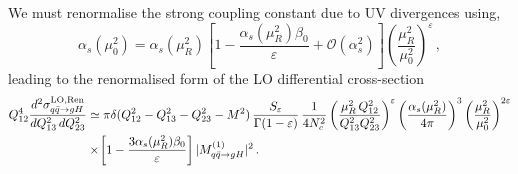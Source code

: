 We must renormalise the strong coupling constant due to UV divergences using,
\begin{equation}
  \label{eq:Catani-renorm}
  \alpha_s(\mu_0^2) =
\alpha_s(\mu_R^2)
  \!\left[1-\frac{\alpha_s(\mu_R^2)\beta_0}{\varepsilon}
  +\mathcal{O}(\alpha_s^2)\right] \left(\frac{\mu_R^2}{\mu_0^2}\right)^\varepsilon\,,
\end{equation}
leading to the renormalised form of the LO differential cross-section
\begin{equation}
\begin{aligned}
  \label{eq:LO-ren}
  Q_{12}^4\frac{d^2\sigma_{q\bar{q}\to gH}^{{\rm LO},\rm Ren}}{dQ_{13}^2\,dQ_{23}^2}& \simeq
  \pi\delta(Q_{12}^2-Q_{13}^2-Q_{23}^2-M^2)\,
  \frac{S_\varepsilon}{\Gamma(1-\varepsilon)}
  \,\frac{1}{4N_c^2}
  \left(\frac{\mu_R^2\,Q_{12}^2}{Q_{13}^2Q_{23}^2}\right)^\varepsilon
\left(\frac{\alpha_s(\mu_R^2)}{4\pi}\right)^3
\left(\frac{\mu_R^2}{\mu_0^2}\right)^{2\varepsilon}\\
&\times  \!\left[1-\frac{3\alpha_s(\mu_R^2)\beta_0}{\varepsilon}\right] |M_{q\bar{q}\to gH}^{(1)}|^2\,.
  \end{aligned}
  \end{equation}
 
